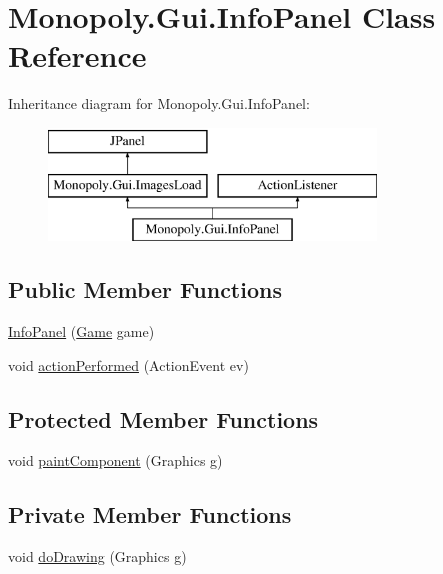 \hypertarget{class_monopoly_1_1_gui_1_1_info_panel}{}\section{Monopoly.\+Gui.\+Info\+Panel Class Reference}
\label{class_monopoly_1_1_gui_1_1_info_panel}
Inheritance diagram for Monopoly.\+Gui.\+Info\+Panel\+:\begin{figure}[H]
\begin{center}
\leavevmode
\includegraphics[height=3.000000cm]{class_monopoly_1_1_gui_1_1_info_panel}
\end{center}
\end{figure}
\subsection*{Public Member Functions}
\begin{DoxyCompactItemize}
\item 
\hyperlink{class_monopoly_1_1_gui_1_1_info_panel_a79285c251ce146b785b7e2dbd5ce68e5}{Info\+Panel} (\hyperlink{class_monopoly_1_1_logic_1_1_game}{Game} game)
\item 
void \hyperlink{class_monopoly_1_1_gui_1_1_info_panel_a89f49067b27d7f3f320778a42e1d796e}{action\+Performed} (Action\+Event ev)
\end{DoxyCompactItemize}
\subsection*{Protected Member Functions}
\begin{DoxyCompactItemize}
\item 
void \hyperlink{class_monopoly_1_1_gui_1_1_info_panel_aadf42effada19db0c6f5f3b599b0502d}{paint\+Component} (Graphics g)
\end{DoxyCompactItemize}
\subsection*{Private Member Functions}
\begin{DoxyCompactItemize}
\item 
void \hyperlink{class_monopoly_1_1_gui_1_1_info_panel_ae3f6163ac311926fb01e180a43afeedf}{do\+Drawing} (Graphics g)
\end{DoxyCompactItemize}
